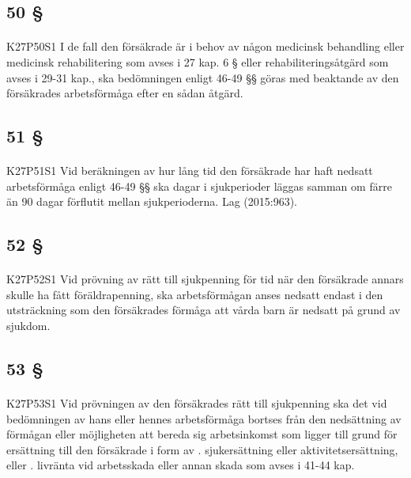 \documentclass[a4paper,notitlepage,openany,10pt]{book}
\begin{document}
\subsection*{50 §}
\paragraph*{}
{\tiny K27P50S1}
I de fall den försäkrade är i behov av någon medicinsk behandling eller medicinsk rehabilitering som avses i 27 kap. 6 § eller rehabiliteringsåtgärd som avses i 29-31 kap., ska bedömningen enligt 46-49 §§ göras med beaktande av den försäkrades arbetsförmåga efter en sådan åtgärd.
\subsection*{51 §}
\paragraph*{}
{\tiny K27P51S1}
Vid beräkningen av hur lång tid den försäkrade har haft nedsatt arbetsförmåga enligt 46-49 §§ ska dagar i sjukperioder läggas samman om färre än 90 dagar förflutit mellan sjukperioderna.
Lag (2015:963).
\subsection*{52 §}
\paragraph*{}
{\tiny K27P52S1}
Vid prövning av rätt till sjukpenning för tid när den försäkrade annars skulle ha fått föräldrapenning, ska arbetsförmågan anses nedsatt endast i den utsträckning som den försäkrades förmåga att vårda barn är nedsatt på grund av sjukdom.
\subsection*{53 §}
\paragraph*{}
{\tiny K27P53S1}
Vid prövningen av den försäkrades rätt till sjukpenning ska det vid bedömningen av hans eller hennes arbetsförmåga bortses från den nedsättning av förmågan eller möjligheten att bereda sig arbetsinkomst som ligger till grund för ersättning till den försäkrade i form av
. sjukersättning eller aktivitetsersättning, eller
. livränta vid arbetsskada eller annan skada som avses i 41-44 kap.
\end{document}
